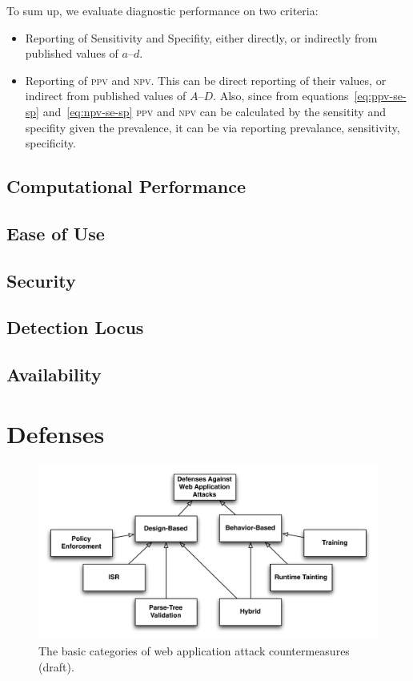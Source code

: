 \documentclass[conference]{IEEEtran}
\begin{document}
To sum up, we evaluate diagnostic performance on two criteria:

\begin{itemize}
\item Reporting of Sensitivity and Specifity, either directly, or
  indirectly from published values of $a$--$d$.
\item Reporting of \textsc{ppv} and \textsc{npv}. This can be direct
  reporting of their values, or indirect from published values of
  $A$--$D$. Also, since from equations~\ref{eq:ppv-se-sp}
  and~\ref{eq:npv-se-sp} \textsc{ppv} and \textsc{npv} can be
  calculated by the sensitity and specifity given the prevalence, it
  can be via reporting prevalance, sensitivity, specificity.
\end{itemize}
 
\subsection{Computational Performance}

\subsection{Ease of Use}

\subsection{Security}

\subsection{Detection Locus}

\subsection{Availability}

\section{Defenses}
\label{sec:defs}

\begin{figure} [ht]
\begin{center}
\leavevmode
\includegraphics[scale=0.65]{defenses.pdf}
\end{center}
\caption{\label{fig:defenses}The basic categories of web application
attack countermeasures ({\sc draft}).}
\end{figure}
\end{document}
